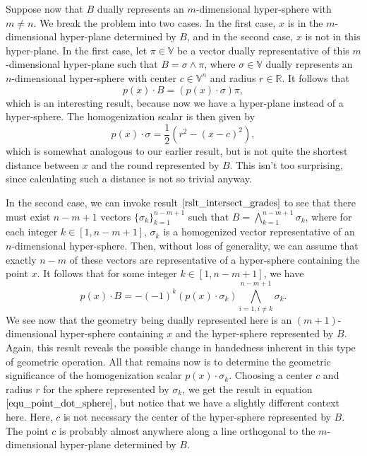 \documentclass[12pt]{article}
\newcommand{\V}{\mathbb{V}}
\newcommand{\R}{\mathbb{R}}
\begin{document}
Suppose now that $B$ dually represents an $m$-dimensional
hyper-sphere with $m\neq n$.  We break the problem into
two cases.  In the first case, $x$ is in the $m$-dimensional
hyper-plane determined by $B$, and in the second case,
$x$ is not in this hyper-plane.  In the first case, let $\pi\in\V$
be a vector dually representative of this $m$-dimensional
hyper-plane such that $B=\sigma\wedge\pi$, where $\sigma\in\V$
dually represents an $n$-dimensional hyper-sphere with center $c\in\V^n$
and radius $r\in\R$.  It follows that
\begin{equation*}
p(x)\cdot B = (p(x)\cdot\sigma)\pi,
\end{equation*}
which is an interesting result, because now we have a hyper-plane instead of a hyper-sphere.
The homogenization scalar is then given by
\begin{equation}\label{equ_point_dot_sphere}
p(x)\cdot\sigma = \frac{1}{2}(r^2-(x-c)^2),
\end{equation}
which is somewhat analogous to our earlier result, but is not quite the shortest
distance between $x$ and the round represented by $B$.  This isn't too surprising,
since calculating such a distance is not so trivial anyway.

In the second case, we can invoke result $\eqref{rslt_intersect_grades}$ to
see that there must exist $n-m+1$ vectors $\{\sigma_k\}_{k=1}^{n-m+1}$
such that $B=\bigwedge_{k=1}^{n-m+1}\sigma_k$, where for each
integer $k\in[1,n-m+1]$, $\sigma_k$ is a homogenized vector representative
of an $n$-dimensional hyper-sphere.  Then, without loss of generality,
we can assume that exactly $n-m$ of these vectors are representative
of a hyper-sphere containing the point $x$.  It follows that for some integer $k\in[1,n-m+1]$,
we have
\begin{equation*}
p(x)\cdot B = -(-1)^k(p(x)\cdot\sigma_k)\bigwedge_{i=1,i\neq k}^{n-m+1}\sigma_k.
\end{equation*}
We see now that the geometry being dually represented here is an $(m+1)$-dimensional
hyper-sphere containing $x$ and the hyper-sphere represented by $B$.  Again,
this result reveals the possible change in handedness inherent in this type of geometric operation.
All that remains now is to determine the geometric significance of the homogenization
scalar $p(x)\cdot\sigma_k$.  Choosing a center $c$ and radius $r$ for the sphere
represented by $\sigma_k$, we get the result in equation $\eqref{equ_point_dot_sphere}$,
but notice that we have a slightly different context here.  Here, $c$ is not necessary
the center of the hyper-sphere represented by $B$.  The point $c$ is probably
almost anywhere along a line orthogonal to the $m$-dimensional hyper-plane
determined by $B$.
\end{document}
